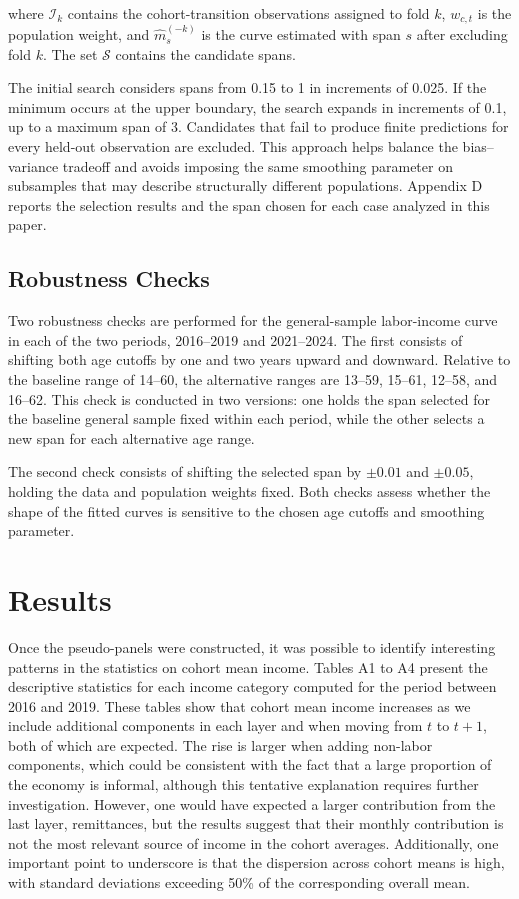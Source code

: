\documentclass{article}
\begin{document}
where $\mathcal{I}_k$ contains the cohort-transition observations assigned to fold $k$, $w_{c,t}$ is the population weight, and $\hat{m}_{s}^{(-k)}$ is the curve estimated with span $s$ after excluding fold $k$. The set $\mathcal{S}$ contains the candidate spans.

The initial search considers spans from 0.15 to 1 in increments of 0.025. If the minimum occurs at the upper boundary, the search expands in increments of 0.1, up to a maximum span of 3. Candidates that fail to produce finite predictions for every held-out observation are excluded. This approach helps balance the bias--variance tradeoff and avoids imposing the same smoothing parameter on subsamples that may describe structurally different populations. Appendix D reports the selection results and the span chosen for each case analyzed in this paper.

\subsection{Robustness Checks}

Two robustness checks are performed for the general-sample labor-income curve in each of the two periods, 2016--2019 and 2021--2024. The first consists of shifting both age cutoffs by one and two years upward and downward. Relative to the baseline range of 14--60, the alternative ranges are 13--59, 15--61, 12--58, and 16--62. This check is conducted in two versions: one holds the span selected for the baseline general sample fixed within each period, while the other selects a new span for each alternative age range.

The second check consists of shifting the selected span by $\pm 0.01$ and $\pm 0.05$, holding the data and population weights fixed. Both checks assess whether the shape of the fitted curves is sensitive to the chosen age cutoffs and smoothing parameter.

\section{Results}

Once the pseudo-panels were constructed, it was possible to identify interesting patterns in the statistics on cohort mean income. Tables A1 to A4 present the descriptive statistics for each income category computed for the period between 2016 and 2019. These tables show that cohort mean income increases as we include additional components in each layer and when moving from $t$ to $t+1$, both of which are expected. The rise is larger when adding non-labor components, which could be consistent with the fact that a large proportion of the economy is informal, although this tentative explanation requires further investigation. However, one would have expected a larger contribution from the last layer, remittances, but the results suggest that their monthly contribution is not the most relevant source of income in the cohort averages. Additionally, one important point to underscore is that the dispersion across cohort means is high, with standard deviations exceeding 50\% of the corresponding overall mean.
\end{document}
